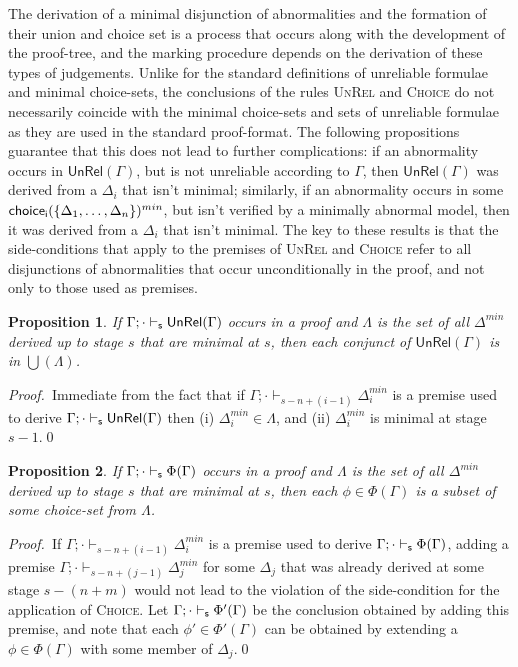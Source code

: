 \documentclass[]{article}
\newtheorem{proposition}{Proposition}
\newcommand{\Turn}[2]
    { {#1}\vdash_{\textbf{\sf s}}  {#2}}
\newcommand{\Unrel}{\ensuremath{\mathsf{UnRel}}}
\begin{document}
The derivation of a minimal disjunction of abnormalities and the formation of their union and choice set is a process that occurs along with the development of the proof-tree, and the marking procedure depends on the derivation of these types of judgements. Unlike for the standard definitions of unreliable formulae and minimal choice-sets, the conclusions of the rules \textsc{UnRel} and \textsc{Choice} do not necessarily coincide with the minimal choice-sets and sets of unreliable formulae as they are used in the standard proof-format. The following propositions guarantee that this does not lead to further complications: if an abnormality occurs in $\Unrel(\Gamma)$, but is not unreliable according to $\Gamma$, then $\Unrel(\Gamma)$ was derived from a $\Delta_i$ that isn't minimal; similarly, if an abnormality occurs in some ${\sf choice_{i}}(\{\Delta_{1},\ldots, \Delta_{n}\})^{min}$, but isn't verified by a minimally abnormal model, then it was derived from a $\Delta_i$ that isn't minimal. The key to these results is that the side-conditions that apply to the premises of \textsc{UnRel} and \textsc{Choice} refer to all disjunctions of abnormalities that occur unconditionally in the proof, and not only to those used as premises.

\begin{proposition}\label{prop:unrel}
    If $\Turn{\Gamma;\cdot}{\Unrel(\Gamma)}$ occurs in a proof and $\Lambda$ is the set of all $\Delta^{min}$ derived up to stage $s$ that are minimal at $s$, then each conjunct of $\Unrel(\Gamma)$ is in $\bigcup(\Lambda)$.
\end{proposition}
\noindent\textsl{Proof.}~Immediate from the fact that if $\Gamma; \cdot \vdash_{s - n  + (i-1)} \Delta_i^{min}$ is a premise used to derive $\Turn{\Gamma;\cdot}{\Unrel(\Gamma)}$ then (i) $\Delta_i^{min} \in \Lambda$, and (ii) $\Delta_i^{min}$ is minimal at stage $s-1$.\qed

\begin{proposition}\label{prop:choice}
    If $\Turn{\Gamma;\cdot}{\Phi(\Gamma)}$ occurs in a proof and $\Lambda$ is the set of all $\Delta^{min}$ derived up to stage $s$ that are minimal at $s$, then each $\phi \in \Phi(\Gamma)$ is a subset of some choice-set from $\Lambda$.
\end{proposition}
\noindent\textsl{Proof.}~If $\Gamma; \cdot \vdash_{s - n  + (i-1)} \Delta_i^{min}$ is a premise used to derive $\Turn{\Gamma;\cdot}{\Phi(\Gamma)}$, adding a premise $\Gamma; \cdot \vdash_{s - n  + (j-1)} \Delta_j^{min}$ for some $\Delta_j$ that was already derived at some stage $s - (n + m)$ would not lead to the violation of the side-condition for the application of \textsc{Choice}. Let $\Turn{\Gamma;\cdot}{\Phi'(\Gamma)}$ be the conclusion obtained by adding this premise, and note that each $\phi' \in \Phi'(\Gamma)$ can be obtained by extending a $\phi \in \Phi(\Gamma)$ with some member of $\Delta_j$.\qed
\end{document}
